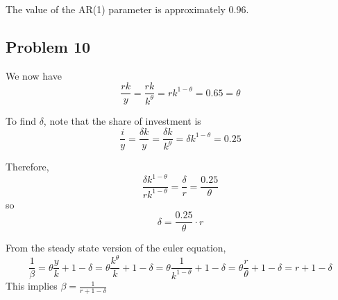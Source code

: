 \documentclass[11pt]{article}
\begin{document}
    The value of the AR(1) parameter is approximately 0.96.

    \hypertarget{problem-10}{%
\subsection{Problem 10}\label{problem-10}}

We now have \[
\frac{rk}{y} = \frac{rk}{k^\theta} = rk^{1 - \theta} = 0.65 = \theta
\]

To find \(\delta\), note that the share of investment is \[
\frac{i}{y} = \frac{\delta k}{y} = \frac{\delta k}{k^\theta} = \delta k^{1 - \theta} = 0.25
\]

Therefore, \[
\frac{\delta k^{1 - \theta}}{r k^{1 - \theta}}
= \frac{\delta}{r} = \frac{0.25}{\theta}
\] so \[
\delta = \frac{0.25}{\theta} \cdot r
\]

From the steady state version of the euler equation, \[
\frac{1}{\beta} 
= \theta \frac{y}{k} + 1 - \delta 
= \theta \frac{k^\theta}{k} + 1 - \delta 
= \theta \frac{1}{k^{1-\theta}} + 1 - \delta 
= \theta \frac{r}{\theta} + 1 - \delta
= r + 1 - \delta
\] This implies \(\beta = \frac{1}{r + 1 - \delta}\)
\end{document}
